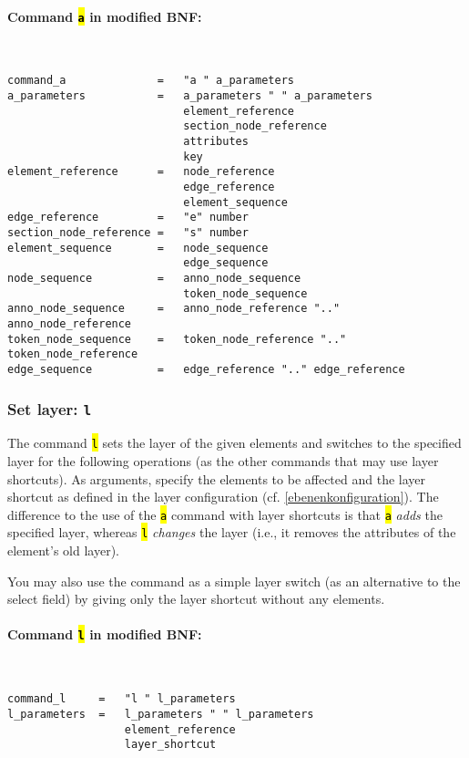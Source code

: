 \documentclass[12pt]{scrartcl}
\newcommand{\code}[1]{\hl{\texttt{#1}}}
\begin{document}
\paragraph*{Command \code{a} in modified BNF:}
~
\begin{lstlisting}
command_a              =   "a " a_parameters
a_parameters           =   a_parameters " " a_parameters
                           element_reference
                           section_node_reference
                           attributes
                           key
element_reference      =   node_reference
                           edge_reference
                           element_sequence
edge_reference         =   "e" number
section_node_reference =   "s" number
element_sequence       =   node_sequence
                           edge_sequence
node_sequence          =   anno_node_sequence
                           token_node_sequence
anno_node_sequence     =   anno_node_reference ".." anno_node_reference
token_node_sequence    =   token_node_reference ".." token_node_reference
edge_sequence          =   edge_reference ".." edge_reference
\end{lstlisting}


\subsubsection{Set layer: \texttt{l}}\label{befehl-l}

The command \code{l} sets the layer of the given elements and switches to the specified layer for the following operations (as the other commands that may use layer shortcuts).
As arguments, specify the elements to be affected and the layer shortcut as defined in the layer configuration (cf. \ref{ebenenkonfiguration}).
The difference to the use of the \code{a} command with layer shortcuts is that \code{a} \textit{adds} the specified layer, whereas \code{l} \textit{changes} the layer (i.e., it removes the attributes of the element’s old layer).

You may also use the command as a simple layer switch (as an alternative to the select field) by giving only the layer shortcut without any elements.

\paragraph*{Command \code{l} in modified BNF:}
~
\begin{lstlisting}
command_l     =   "l " l_parameters
l_parameters  =   l_parameters " " l_parameters
                  element_reference
                  layer_shortcut
\end{lstlisting}
\end{document}
